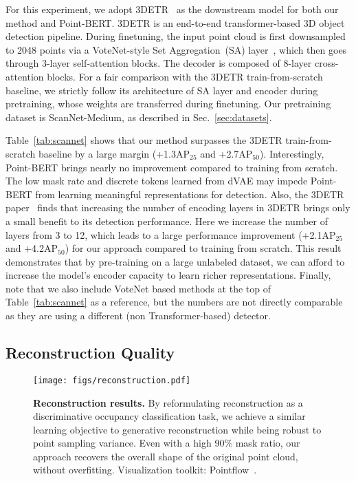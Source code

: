 \documentclass[runningheads]{llncs}
\begin{document}
For this experiment, we adopt 3DETR~\cite{misra2021-3detr} as the downstream model for both our method and Point-BERT. 3DETR is an end-to-end transformer-based 3D object detection pipeline.
During finetuning, the input point cloud is first downsampled to 2048 points via a VoteNet-style Set Aggregation~(SA) layer~\cite{qi2019deep,qi2017pointnetplusplus}, which then goes through 3-layer self-attention blocks. The decoder is composed of 8-layer cross-attention blocks. For a fair comparison with the 3DETR train-from-scratch baseline, we strictly follow its architecture of SA layer and encoder during pretraining, whose weights are transferred during finetuning.
Our pretraining dataset is ScanNet-Medium, as described in Sec.~\ref{sec:datasets}.

Table~\ref{tab:scannet} shows that our method surpasses the 3DETR train-from-scratch baseline by a large margin (+1.3AP$_{25}$ and +2.7AP$_{50}$). Interestingly, Point-BERT brings nearly no improvement compared to training from scratch. The low mask rate and discrete tokens learned from dVAE may impede Point-BERT from learning meaningful representations for detection.
Also, the 3DETR paper~\cite{misra2021-3detr} finds that increasing the number of encoding layers in 3DETR brings only a small benefit to its detection performance. Here we increase the number of layers from 3 to 12, which leads to a large performance improvement (+2.1AP$_{25}$ and +4.2AP$_{50}$) for our approach compared to training from scratch. This result demonstrates that by pre-training on a large unlabeled dataset, we can afford to increase the model's encoder capacity to learn richer representations. Finally, note that we also include VoteNet based methods at the top of Table~\ref{tab:scannet} as a reference, but the numbers are not directly comparable as they are using a different (non Transformer-based) detector.

\subsection{Reconstruction Quality}

\begin{figure}[t!]
    \centering
    \texttt{[image: figs/reconstruction.pdf]}
    \caption{\textbf{Reconstruction results.}
    By reformulating reconstruction as a discriminative occupancy classification task, we achieve a similar learning objective to generative reconstruction while being robust to point sampling variance.
    Even with a high 90\% mask ratio, our approach recovers the overall shape of the original point cloud, without overfitting. Visualization toolkit: Pointflow~\cite{pointflow}.
    }
    \label{fig:reconstruction}
\end{figure}
\end{document}
